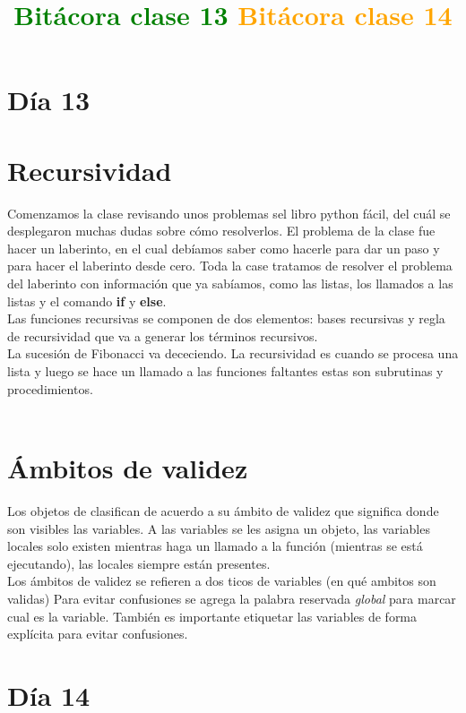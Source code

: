 \documentclass{book}
\begin{document}
	\section{Día 13}
	\begin{center}
		\title {\textcolor{green}{\Huge \textbf{Bitácora clase 13}} }  
	\end{center}
	
	\section{Recursividad}
	
	Comenzamos la clase revisando unos problemas sel libro python fácil, del cuál se desplegaron muchas dudas sobre cómo resolverlos. El problema de la clase fue hacer un laberinto, en el cual debíamos saber como hacerle para dar un paso y para hacer el laberinto desde cero. Toda la case tratamos de resolver el problema del laberinto con información que ya sabíamos, como las listas, los llamados a las listas y el comando \textbf{if} y \textbf{else}.\\
	
	Las funciones recursivas se componen de dos elementos: bases recursivas y regla de recursividad que va a generar los términos recursivos.\\
	La sucesión de Fibonacci va dececiendo.
	La recursividad es cuando se procesa una lista y luego se hace un llamado a las funciones faltantes estas son subrutinas y procedimientos.\\
	\\
	\section{Ámbitos de validez}
	
	Los objetos de clasifican de acuerdo a su ámbito de validez que significa donde son visibles las variables. A las variables se les asigna un objeto, las variables locales solo existen mientras haga un llamado a la función (mientras se está ejecutando), las locales siempre están presentes.\\
	Los ámbitos de validez se refieren a dos ticos de variables (en qué ambitos son validas)
	Para evitar confusiones se agrega la palabra reservada \textit{global} para marcar cual es la variable.
	También es importante etiquetar las variables de forma explícita para evitar confusiones.
	
	
	
	\section{Día 14}
	\begin{center}
	\title {\textcolor{orange}{\Huge \textbf{Bitácora clase 14}} }  
	\end{center}
	
\end{document}
